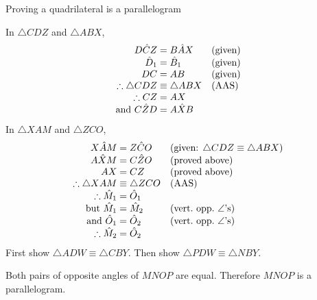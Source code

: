 \begin{wex}{Proving a quadrilateral is a parallelogram}
{  
  In $\triangle CDZ$ and $\triangle ABX$,
\vspace*{-1em}
  \begin{equation*}
    \begin{array}{r@{\;}l@{\quad}l}
      D\hat{C}Z &= B\hat{A}X & \mbox{(given)} \\
      \hat{D}_{1} &= \hat{B}_{1} & \mbox{(given)} \\
      DC &= AB & \mbox{(given)}\\
      \therefore \triangle CDZ &\equiv \triangle ABX & \mbox{(AAS)} \\ 
      \therefore CZ &= AX & \\
      \mbox{and } C\hat{Z}D  &=  A\hat{X}B&
    \end{array}
  \end{equation*}
\vspace*{-1em}
  In $\triangle XAM$ and $\triangle ZCO$,
  \begin{equation*}
    \begin{array}{r@{\;}l@{\quad}l}
      X\hat{A}M &= Z\hat{C}O & \mbox{(given: $\triangle CDZ \equiv \triangle ABX$)} \\
      A\hat{X}M &= C\hat{Z}O & \mbox{(proved above)} \\
      AX &= CZ & \mbox{(proved above)} \\
      \therefore \triangle XAM &\equiv \triangle ZCO & \mbox{(AAS)} \\
      \therefore  \hat{M}_{1}&=  \hat{O}_{1}& \\
      \mbox{but } \hat{M}_1 &= \hat{M}_2 & \mbox{(vert.\ opp.\ $\angle$'s)} \\
      \mbox{and } \hat{O}_{1} &= \hat{O}_2 & \mbox{(vert.\ opp.\ $\angle$'s)} \\
      \therefore \hat{M}_2 &= \hat{O}_{2} &
    \end{array}
  \end{equation*}
\vspace*{-2em}
  First show $\triangle ADW \equiv \triangle CBY$. Then show $\triangle
  PDW \equiv \triangle NBY$.

  Both pairs of opposite angles of $MNOP$ are equal. Therefore $MNOP$ is
  a parallelogram.
}
\end{wex}


